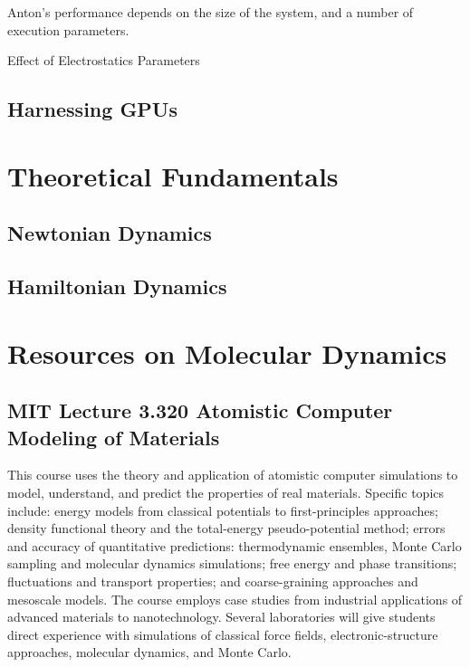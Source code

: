 \documentclass[a4paper,10pt,technote,compsoc,onecolumn]{IEEEtran}
\numberwithin{equation}{section}
\begin{document}

Anton's performance depends on the size of the system, and a number of
execution parameters.
\begin{table}[htp]
\caption{Effect of Electrostatics Parameters}
\label{tab:anton_profiles}
\centering

\end{table}

\subsection{Harnessing GPUs}

\appendices
\section{Theoretical Fundamentals}
\subsection{Newtonian Dynamics}

\subsection{Hamiltonian Dynamics}

\section{Resources on Molecular Dynamics}
\subsection{MIT Lecture 3.320 Atomistic Computer Modeling of Materials}
This course uses the theory and application of atomistic computer simulations
to model, understand, and predict the properties of real materials. Specific
topics include: energy models from classical potentials to first-principles
approaches; density functional theory and the total-energy pseudo-potential
method; errors and accuracy of quantitative predictions: thermodynamic
ensembles, Monte Carlo sampling and molecular dynamics simulations; free energy
and phase transitions; fluctuations and transport properties; and
coarse-graining approaches and mesoscale models. The course employs case
studies from industrial applications of advanced materials to nanotechnology.
Several laboratories will give students direct experience with simulations of
classical force fields, electronic-structure approaches, molecular dynamics,
and Monte Carlo.
\end{document}

